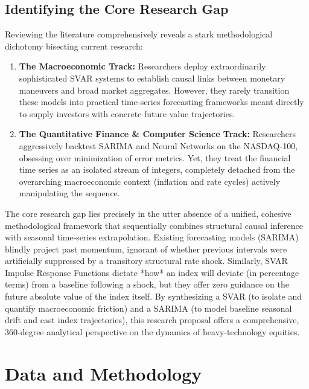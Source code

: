\documentclass[12pt,a4paper]{report}
\begin{document}
\section{Identifying the Core Research Gap}
Reviewing the literature comprehensively reveals a stark methodological dichotomy bisecting current research:
\begin{enumerate}
    \item \textbf{The Macroeconomic Track:} Researchers deploy extraordinarily sophisticated SVAR systems to establish causal links between monetary maneuvers and broad market aggregates. However, they rarely transition these models into practical time-series forecasting frameworks meant directly to supply investors with concrete future value trajectories.
    \item \textbf{The Quantitative Finance \& Computer Science Track:} Researchers aggressively backtest SARIMA and Neural Networks on the NASDAQ-100, obsessing over minimization of error metrics. Yet, they treat the financial time series as an isolated stream of integers, completely detached from the overarching macroeconomic context (inflation and rate cycles) actively manipulating the sequence.
\end{enumerate}

The core research gap lies precisely in the utter absence of a unified, cohesive methodological framework that sequentially combines structural causal inference with seasonal time-series extrapolation. Existing forecasting models (SARIMA) blindly project past momentum, ignorant of whether previous intervals were artificially suppressed by a transitory structural rate shock. Similarly, SVAR Impulse Response Functions dictate *how* an index will deviate (in percentage terms) from a baseline following a shock, but they offer zero guidance on the future absolute value of the index itself. By synthesizing a SVAR (to isolate and quantify macroeconomic friction) and a SARIMA (to model baseline seasonal drift and cast index trajectories), this research proposal offers a comprehensive, 360-degree analytical perspective on the dynamics of heavy-technology equities.

\chapter{Data and Methodology}
\end{document}
